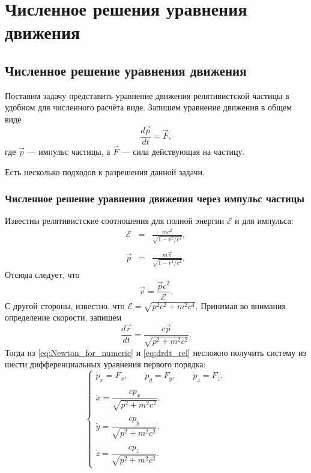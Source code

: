 
\chapter{Численное решения уравнения движения} \label{AppendixA}


\section{Численное решение уравнения движения}

Поставим задачу представить уравнение движения релятивистской частицы в удобном для численного расчёта виде. Запишем уравнение движения в общем виде
\begin{equation}
\frac{d \vec{p}}{dt} = \vec{F},
\label{eq:Newton_for_numeric}
\end{equation}
где $\vec{p}$ --- импульс частицы, а $\vec{F}$ --- сила действующая на частицу. 

Есть несколько подходов к разрешения данной задачи.

\subsection{Численное решение уравнения движения через импульс частицы}


Известны релятивистские соотношения для полной энергии $\mathscr{E}$ и для импульса:
\begin{eqnarray*}
	\mathscr{E} &=& \frac{mc^2}{\sqrt{1 - v^2/c^2}},\\ \nonumber \\
	\vec{p} &=& \frac{m\vec{v}}{\sqrt{1 - v^2/c^2}}.
\end{eqnarray*}
Отсюда следует, что
\begin{equation}
	\vec{v} = \frac{\vec{p}c^2}{\mathscr{E}}.
\end{equation}
С другой стороны, известно, что $\mathscr{E} = \sqrt{p^2c^2 + m^2 c^4}$.
Принимая во внимания определение скорости, запишем
\begin{equation}
	\frac{d\vec{r}}{dt} = \frac{c \vec{p}}{\sqrt{p^2 + m^2 c^2}}.
	\label{eq:drdt_rel}
\end{equation}
Тогда из \eqref{eq:Newton_for_numeric} и \eqref{eq:drdt_rel} несложно получить систему из шести дифференциальных уравнения первого порядка:
\begin{equation}
	\begin{cases}
	\dot{p}_x = F_x, \qquad \dot{p}_y = F_y, \qquad \dot{p}_z = F_z, \\ \\
	\dot{x} = \dfrac{c p_x}{\sqrt{p^2 + m^2 c^2}}, \\ \\
	\dot{y} = \dfrac{c p_y}{\sqrt{p^2 + m^2 c^2}}, \\ \\
	\dot{z} = \dfrac{c p_z}{\sqrt{p^2 + m^2 c^2}}.
	\end{cases}
	\label{eq:style1}
\end{equation}

